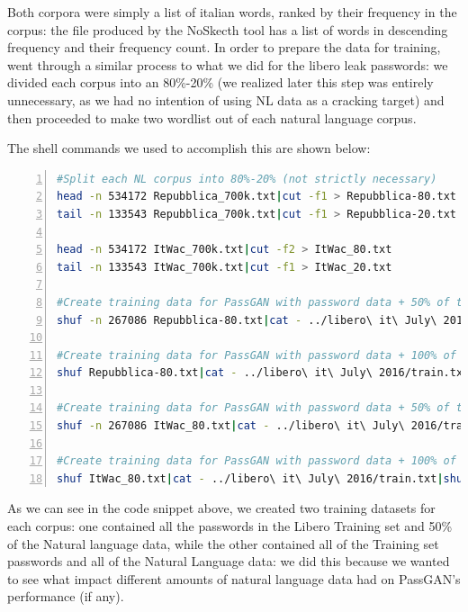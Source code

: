 Both corpora were simply a list of italian words, ranked by their frequency in the corpus: the file produced by the NoSkecth tool has a list of words in descending frequency and their frequency count.
In order to prepare the data for training, went through a similar process to what we did for the libero leak passwords: we divided each corpus into an 80\%-20\% (we realized later this step was entirely unnecessary, as we had no intention of using NL data as a cracking target) and then proceeded to make two wordlist out of each natural language corpus.

The shell commands we used to accomplish this are shown below:

\begin{lstlisting}[language=bash,numbers=left,stepnumber=1,breaklines=true,postbreak=\mbox{\textcolor{red}{$\hookrightarrow$}\space}]
#Split each NL corpus into 80%-20% (not strictly necessary)
head -n 534172 Repubblica_700k.txt|cut -f1 > Repubblica-80.txt
tail -n 133543 Repubblica_700k.txt|cut -f1 > Repubblica-20.txt

head -n 534172 ItWac_700k.txt|cut -f2 > ItWac_80.txt
tail -n 133543 ItWac_700k.txt|cut -f1 > ItWac_20.txt

#Create training data for PassGAN with password data + 50% of the Repubblica corpus
shuf -n 267086 Repubblica-80.txt|cat - ../libero\ it\ July\ 2016/train.txt|shuf > libero+Repubblica-50.txt

#Create training data for PassGAN with password data + 100% of the repubblica corpus
shuf Repubblica-80.txt|cat - ../libero\ it\ July\ 2016/train.txt|shuf > libero+Repubblica.txt

#Create training data for PassGAN with password data + 50% of the ItWaC corpus
shuf -n 267086 ItWac_80.txt|cat - ../libero\ it\ July\ 2016/train.txt|shuf > libero+ItWac-50.txt

#Create training data for PassGAN with password data + 100% of the ItwaC corpus
shuf ItWac_80.txt|cat - ../libero\ it\ July\ 2016/train.txt|shuf > libero+ItWac.txt
\end{lstlisting}

As we can see in the code snippet above, we created two training datasets for each corpus: one contained all the passwords in the Libero Training set and 50\% of the Natural language data, while the other contained all of the Training set passwords and all of the Natural Language data: we did this because we wanted to see what impact different amounts of natural language data had on PassGAN's performance (if any).

